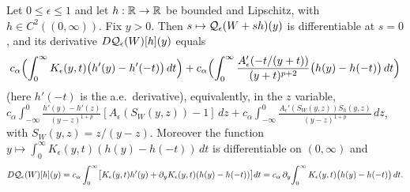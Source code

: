 \begin{lemma}
  \label{lem:c06_wedge_first_variation}
  Let $0\le\epsilon\le1$ and let $h:\mathbb{R}\to\mathbb{R}$ be bounded and Lipschitz, with $h\in C^2((0,\infty))$.
  Fix $y>0$. Then $s\mapsto\mathcal{Q}_\epsilon(W+sh)(y)$ is differentiable at $s=0$, and its derivative
  $D\mathcal{Q}_\epsilon(W)[h](y)$ equals
  \begin{equation}\label{eq:c06_first_variation_F1}
    c_\alpha\Bigl(\int_0^\infty K_\epsilon(y,t)\bigl(h'(y)-h'(-t)\bigr)\,dt\Bigr)
    +c_\alpha\Bigl(\int_0^\infty\frac{A_\epsilon'(-t/(y+t))}{(y+t)^{p+2}}\bigl(h(y)-h(-t)\bigr)\,dt\Bigr)
  \end{equation}
  (here $h'(-t)$ is the a.e.\ derivative), equivalently, in the $z$ variable,
  $c_\alpha\int_{-\infty}^0\frac{h'(y)-h'(z)}{(y-z)^{1+p}}[A_\epsilon(S_W(y,z))-1]\,dz
   +c_\alpha\int_{-\infty}^0\frac{A_\epsilon'(S_W(y,z))S_h(y,z)}{(y-z)^{1+p}}\,dz$, with $S_W(y,z)=z/(y-z)$.
  Moreover the function $y\mapsto\int_0^\infty K_\epsilon(y,t)(h(y)-h(-t))\,dt$ is differentiable on $(0,\infty)$ and
  \begin{equation}\label{eq:c06_first_variation_F2}
    D\mathcal{Q}_\epsilon(W)[h](y)=c_\alpha\int_0^\infty\bigl[K_\epsilon(y,t)h'(y)+\partial_yK_\epsilon(y,t)(h(y)-h(-t))\bigr]dt
    =c_\alpha\,\partial_y\!\int_0^\infty K_\epsilon(y,t)\bigl(h(y)-h(-t)\bigr)\,dt .
  \end{equation}
\end{lemma}
